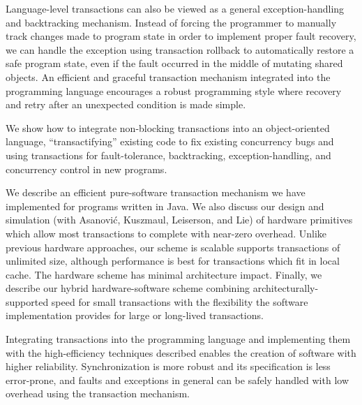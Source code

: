 \documentclass[twoside,twocolumn,notitlepage,letterpaper]{article}
\begin{document}
Language-level transactions can also be viewed as a general
exception-handling and backtracking mechanism.  Instead of forcing the
programmer to manually track changes made to program state in order to
implement proper fault recovery, we can handle the exception using
transaction rollback to automatically restore a safe program state,
even if the fault occurred in the middle of mutating shared objects.
An efficient and graceful transaction mechanism integrated into the
programming language encourages a robust programming style where
recovery and retry after an unexpected condition is made simple.

We show how to integrate non-blocking transactions into an
object-oriented language, ``transactifying'' existing code to fix
existing concurrency bugs and using transactions for fault-tolerance,
backtracking, exception-handling, and concurrency control in new
programs.

We describe an efficient pure-software transaction mechanism we have
implemented for programs written in Java.  We also discuss our design
and simulation (with Asanovi\'c, Kuszmaul, Leiserson, and Lie) of
hardware primitives which allow most transactions to complete with
near-zero overhead.  Unlike previous hardware approaches, our scheme
is scalable supports transactions of unlimited size, although
performance is best for transactions which fit in local cache.  The
hardware scheme has minimal architecture impact.  Finally, we describe
our hybrid hardware-software scheme combining
architecturally-supported speed for small transactions with the
flexibility the software implementation provides for large or
long-lived transactions.

Integrating transactions into the programming language and
implementing them with the high-efficiency techniques described
enables the creation of software with higher reliability.
Synchronization is more robust and its specification is less
error-prone, and faults and exceptions in general can be safely handled
with low overhead using the transaction mechanism.

%
%
\end{document}
